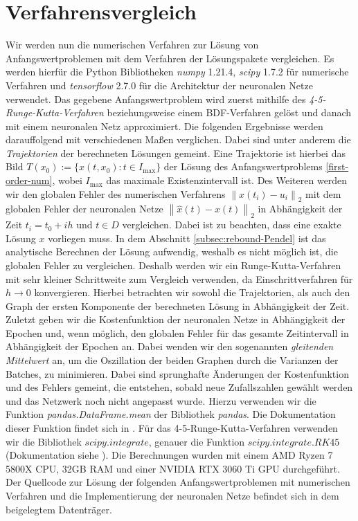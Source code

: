 \section{Verfahrensvergleich}
\label{sec:verfahrensvergleich}
Wir werden nun die numerischen Verfahren zur Lösung von Anfangswertproblemen mit dem Verfahren der Lösungspakete
vergleichen. Es werden hierfür die Python Bibliotheken \textit{numpy} 1.21.4, \textit{scipy} 1.7.2 für numerische
Verfahren und \textit{tensorflow} 2.7.0 für die Architektur der neuronalen Netze verwendet. Das gegebene
Anfangswertproblem wird zuerst mithilfe des \textit{4-5-Runge-Kutta-Verfahren} beziehungsweise einem BDF-Verfahren
gelöst und danach mit einem neuronalen Netz approximiert. Die folgenden Ergebnisse werden darauffolgend mit
verschiedenen Maßen verglichen. Dabei sind unter anderem die \textit{Trajektorien} der berechneten Lösungen gemeint.
Eine Trajektorie ist hierbei das Bild $T(x_0):= \{x(t,x_0): t\in I_{\text{max}}\}$ der Lösung des Anfangswertproblems
\eqref{first-order-num}, wobei $I_{\text{max}}$ das maximale Existenzintervall ist. Des Weiteren werden wir den globalen
Fehler des numerischen Verfahrens $\left\lVert x(t_i) - u_i \right\rVert_2$ mit dem globalen Fehler der neuronalen Netze
$\left\lVert \hat{x}(t) - x(t) \right\rVert_2$ in Abhängigkeit der Zeit $t_i=t_0 + ih$ und $t\in D$ vergleichen. Dabei
ist zu beachten, dass eine exakte Lösung $x$ vorliegen muss. In dem Abschnitt \ref{subsec:rebound-Pendel} ist das
analytische Berechnen der Lösung aufwendig, weshalb es nicht möglich ist, die globalen Fehler zu vergleichen. Deshalb
werden wir ein Runge-Kutta-Verfahren mit sehr kleiner Schrittweite zum Vergleich verwenden, da Einschrittverfahren für
$h \rightarrow 0$ konvergieren. Hierbei betrachten wir sowohl die Trajektorien, als auch den Graph der ersten Komponente
der berechneten Lösung in Abhängigkeit der Zeit.
Zuletzt geben wir die Kostenfunktion der neuronalen Netze in Abhängigkeit der Epochen und, wenn möglich, den globalen
Fehler für das gesamte Zeitintervall in Abhängigkeit der Epochen an. Dabei wenden wir den sogenannten
\textit{gleitenden Mittelwert} an, um die Oszillation der beiden Graphen durch die Varianzen der Batches, zu
minimieren. Dabei sind sprunghafte Änderungen der Kostenfunktion und des Fehlers gemeint, die entstehen, sobald neue
Zufallszahlen gewählt werden und das Netzwerk noch nicht angepasst wurde. Hierzu verwenden wir die Funktion
\textit{pandas.DataFrame.mean} der Bibliothek \textit{pandas}. Die Dokumentation dieser Funktion findet sich in
\cite{PandasDataFrameMean}. Für das 4-5-Runge-Kutta-Verfahren verwenden wir die Bibliothek $scipy.integrate$, genauer
die Funktion $scipy.integrate.RK45$ (Dokumentation siehe \cite{ScipyIntegrateRK45}). Die Berechnungen wurden mit einem
AMD Ryzen 7 5800X CPU, 32GB RAM und einer NVIDIA RTX 3060 Ti GPU durchgeführt. Der Quellcode zur Lösung der folgenden
Anfangswertproblemen mit numerischen Verfahren und die Implementierung der neuronalen Netze befindet sich in dem
beigelegtem Datenträger.

